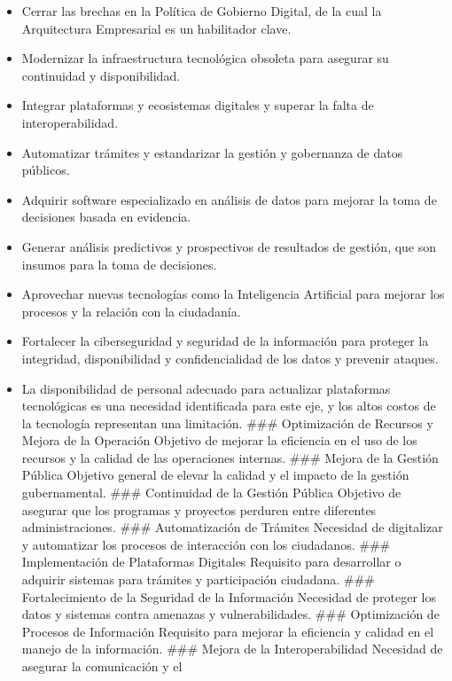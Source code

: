 \documentclass[
	a4paper, %
	12pt, %
]{include/CSSullivanBusinessReport}
\def\tightlist{}
\begin{document}
\begin{itemize}
\tightlist
\item
  Cerrar las brechas en la Política de Gobierno Digital, de la cual la
  Arquitectura Empresarial es un habilitador clave.
\item
  Modernizar la infraestructura tecnológica obsoleta para asegurar su
  continuidad y disponibilidad.
\item
  Integrar plataformas y ecosistemas digitales y superar la falta de
  interoperabilidad.
\item
  Automatizar trámites y estandarizar la gestión y gobernanza de datos
  públicos.
\item
  Adquirir software especializado en análisis de datos para mejorar la
  toma de decisiones basada en evidencia.
\item
  Generar análisis predictivos y prospectivos de resultados de gestión,
  que son insumos para la toma de decisiones.
\item
  Aprovechar nuevas tecnologías como la Inteligencia Artificial para
  mejorar los procesos y la relación con la ciudadanía.
\item
  Fortalecer la ciberseguridad y seguridad de la información para
  proteger la integridad, disponibilidad y confidencialidad de los datos
  y prevenir ataques.
\item
  La disponibilidad de personal adecuado para actualizar plataformas
  tecnológicas es una necesidad identificada para este eje, y los altos
  costos de la tecnología representan una limitación. \#\#\#
  Optimización de Recursos y Mejora de la Operación Objetivo de mejorar
  la eficiencia en el uso de los recursos y la calidad de las
  operaciones internas. \#\#\# Mejora de la Gestión Pública Objetivo
  general de elevar la calidad y el impacto de la gestión gubernamental.
  \#\#\# Continuidad de la Gestión Pública Objetivo de asegurar que los
  programas y proyectos perduren entre diferentes administraciones.
  \#\#\# Automatización de Trámites Necesidad de digitalizar y
  automatizar los procesos de interacción con los ciudadanos. \#\#\#
  Implementación de Plataformas Digitales Requisito para desarrollar o
  adquirir sistemas para trámites y participación ciudadana. \#\#\#
  Fortalecimiento de la Seguridad de la Información Necesidad de
  proteger los datos y sistemas contra amenazas y vulnerabilidades.
  \#\#\# Optimización de Procesos de Información Requisito para mejorar
  la eficiencia y calidad en el manejo de la información. \#\#\# Mejora
  de la Interoperabilidad Necesidad de asegurar la comunicación y el

\end{itemize}
\end{document}
